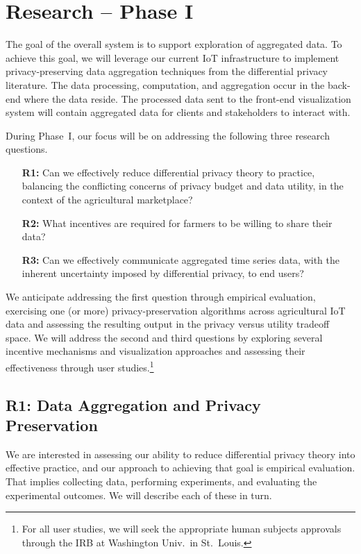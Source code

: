 \section{Research -- Phase I}
\label{sec:research}

The goal of the overall system is to support exploration of aggregated data. 
To achieve this goal, we will leverage our current IoT infrastructure
to implement privacy-preserving data aggregation techniques from the
differential privacy literature.
The data processing, computation, and aggregation occur in the
back-end where the data reside.
The processed data sent to the front-end visualization system will
contain aggregated data for clients and stakeholders to interact with.

During Phase~I, our focus will be on addressing the following three
research questions.
\begin{enumerate}
\item[\textbf{R1:}] Can we effectively reduce differential privacy theory to practice,
balancing the conflicting concerns of privacy budget and data utility, in
the context of the agricultural marketplace?
\item[\textbf{R2:}] What incentives are required for farmers to be willing
to share their data?
\item[\textbf{R3:}] Can we effectively communicate aggregated time series data,
with the inherent uncertainty imposed by differential privacy, to end users?
\end{enumerate}

We anticipate addressing the first question through empirical evaluation,
exercising one (or more) privacy-preservation algorithms across agricultural
IoT data and assessing the resulting output in the privacy
versus utility tradeoff space.  We will address the second and third questions
by exploring several incentive mechanisms and
visualization approaches and assessing their effectiveness
through user studies.\footnote{For all user studies, we will seek the
appropriate human subjects approvals through the IRB at Washington
Univ.~in St.~Louis.}

\subsection{R1: Data Aggregation and Privacy Preservation}
\label{sec:da}

We are interested in assessing our ability to reduce differential
privacy theory into effective practice, and our approach to achieving
that goal is empirical evaluation.  That implies collecting data,
performing experiments, and evaluating the experimental outcomes.
We will describe each of these in turn.

